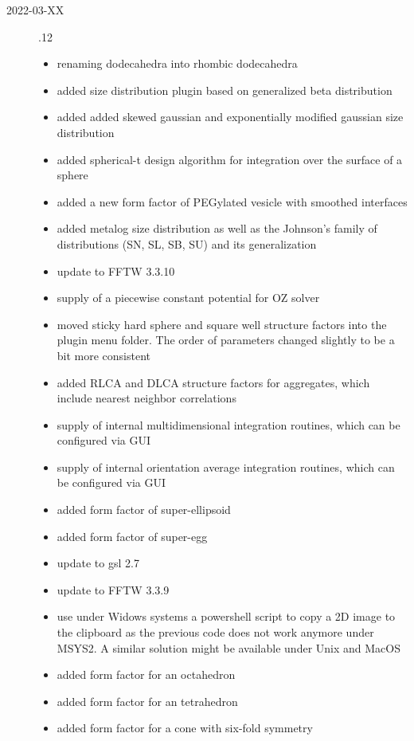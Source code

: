 \begin{description}
\item[2022-03-XX] .12
    \begin{itemize}
    \item renaming dodecahedra into rhombic dodecahedra
    \item added size distribution plugin based on generalized beta distribution
    \item added added skewed gaussian and exponentially modified gaussian size distribution
    \item added spherical-t design algorithm for integration over the surface of a sphere
    \item added a new form factor of PEGylated vesicle with smoothed interfaces
    \item added metalog size distribution as well as the Johnson's family of distributions (SN, SL, SB, SU) and its generalization
    \item update to FFTW 3.3.10
    \item supply of a piecewise constant potential for OZ solver
    \item moved sticky hard sphere and square well structure factors into the plugin menu folder.
            The order of parameters changed slightly to be a bit more consistent
    \item added RLCA and DLCA structure factors for aggregates, which include nearest neighbor correlations
    \item supply of internal multidimensional integration routines, which can be configured via GUI
    \item supply of internal orientation average integration routines, which can be configured via GUI
    \item added form factor of super-ellipsoid
    \item added form factor of super-egg
    \item update to gsl 2.7
    \item update to FFTW 3.3.9
    \item use under Widows systems a powershell script to copy a 2D image to the clipboard as the previous code does not work anymore under MSYS2. A similar solution might be available under Unix and MacOS
    \item added form factor for an octahedron
    \item added form factor for an tetrahedron
    \item added form factor for a cone with six-fold symmetry

\end{itemize}
\end{description}
